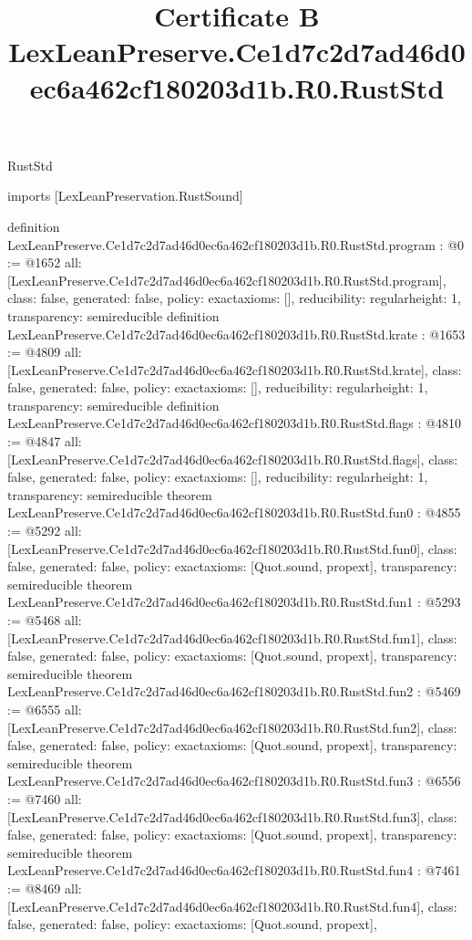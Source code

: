 \begin{lexlean}{RustStd}
\title{Certificate B LexLeanPreserve.Ce1d7c2d7ad46d0ec6a462cf180203d1b.R0.RustStd}
\begin{coremodule}
imports [LexLeanPreservation.RustSound]

definition LexLeanPreserve.Ce1d7c2d7ad46d0ec6a462cf180203d1b.R0.RustStd.program : @0 := @1652 {
  all: [LexLeanPreserve.Ce1d7c2d7ad46d0ec6a462cf180203d1b.R0.RustStd.program],
  class: false,
  generated: false,
  policy: exact{axioms: []},
  reducibility: regular{height: 1},
  transparency: semireducible
}
definition LexLeanPreserve.Ce1d7c2d7ad46d0ec6a462cf180203d1b.R0.RustStd.krate : @1653 := @4809 {
  all: [LexLeanPreserve.Ce1d7c2d7ad46d0ec6a462cf180203d1b.R0.RustStd.krate],
  class: false,
  generated: false,
  policy: exact{axioms: []},
  reducibility: regular{height: 1},
  transparency: semireducible
}
definition LexLeanPreserve.Ce1d7c2d7ad46d0ec6a462cf180203d1b.R0.RustStd.flags : @4810 := @4847 {
  all: [LexLeanPreserve.Ce1d7c2d7ad46d0ec6a462cf180203d1b.R0.RustStd.flags],
  class: false,
  generated: false,
  policy: exact{axioms: []},
  reducibility: regular{height: 1},
  transparency: semireducible
}
theorem LexLeanPreserve.Ce1d7c2d7ad46d0ec6a462cf180203d1b.R0.RustStd.fun0 : @4855 := @5292 {
  all: [LexLeanPreserve.Ce1d7c2d7ad46d0ec6a462cf180203d1b.R0.RustStd.fun0],
  class: false,
  generated: false,
  policy: exact{axioms: [Quot.sound, propext]},
  transparency: semireducible
}
theorem LexLeanPreserve.Ce1d7c2d7ad46d0ec6a462cf180203d1b.R0.RustStd.fun1 : @5293 := @5468 {
  all: [LexLeanPreserve.Ce1d7c2d7ad46d0ec6a462cf180203d1b.R0.RustStd.fun1],
  class: false,
  generated: false,
  policy: exact{axioms: [Quot.sound, propext]},
  transparency: semireducible
}
theorem LexLeanPreserve.Ce1d7c2d7ad46d0ec6a462cf180203d1b.R0.RustStd.fun2 : @5469 := @6555 {
  all: [LexLeanPreserve.Ce1d7c2d7ad46d0ec6a462cf180203d1b.R0.RustStd.fun2],
  class: false,
  generated: false,
  policy: exact{axioms: [Quot.sound, propext]},
  transparency: semireducible
}
theorem LexLeanPreserve.Ce1d7c2d7ad46d0ec6a462cf180203d1b.R0.RustStd.fun3 : @6556 := @7460 {
  all: [LexLeanPreserve.Ce1d7c2d7ad46d0ec6a462cf180203d1b.R0.RustStd.fun3],
  class: false,
  generated: false,
  policy: exact{axioms: [Quot.sound, propext]},
  transparency: semireducible
}
theorem LexLeanPreserve.Ce1d7c2d7ad46d0ec6a462cf180203d1b.R0.RustStd.fun4 : @7461 := @8469 {
  all: [LexLeanPreserve.Ce1d7c2d7ad46d0ec6a462cf180203d1b.R0.RustStd.fun4],
  class: false,
  generated: false,
  policy: exact{axioms: [Quot.sound, propext]},
}
\end{coremodule}
\end{lexlean}
